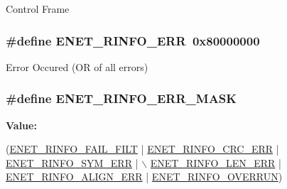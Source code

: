 Control Frame \hypertarget{group__ENET__17XX__40XX_ga15c3af4e6532d6de88860eb58046373a}{
\subsubsection[{E\-N\-E\-T\-\_\-\-R\-I\-N\-F\-O\-\_\-\-E\-R\-R}]{\setlength{\rightskip}{0pt plus 5cm}\#define E\-N\-E\-T\-\_\-\-R\-I\-N\-F\-O\-\_\-\-E\-R\-R~0x80000000}}\label{group__ENET__17XX__40XX_ga15c3af4e6532d6de88860eb58046373a}
Error Occured (O\-R of all errors) \hypertarget{group__ENET__17XX__40XX_ga07c87e5b7136302124084fee594d2d4a}{
\subsubsection[{E\-N\-E\-T\-\_\-\-R\-I\-N\-F\-O\-\_\-\-E\-R\-R\-\_\-\-M\-A\-S\-K}]{\setlength{\rightskip}{0pt plus 5cm}\#define E\-N\-E\-T\-\_\-\-R\-I\-N\-F\-O\-\_\-\-E\-R\-R\-\_\-\-M\-A\-S\-K}}\label{group__ENET__17XX__40XX_ga07c87e5b7136302124084fee594d2d4a}
{\bfseries Value\-:}
\begin{DoxyCode}
(\hyperlink{group__ENET__17XX__40XX_gaf3bb0d91c0511c58691d7189b551fe79}{ENET\_RINFO\_FAIL\_FILT} | \hyperlink{group__ENET__17XX__40XX_gad7ea1586c49309069d1d72a4ebe5aa89}{ENET\_RINFO\_CRC\_ERR}   | 
      \hyperlink{group__ENET__17XX__40XX_ga6c8d6c27397230acdab0d86aae333adb}{ENET\_RINFO\_SYM\_ERR} |  \hyperlink{group__ENET__17XX__40XX_ga9a8b65ee2091950cb6a66c2cf2f8be79}{\(\backslash\)}
\hyperlink{group__ENET__17XX__40XX_ga9a8b65ee2091950cb6a66c2cf2f8be79}{                                 ENET\_RINFO\_LEN\_ERR}   | 
      \hyperlink{group__ENET__17XX__40XX_ga4e4fcb457d4d1a16900c13f7a5a2db46}{ENET\_RINFO\_ALIGN\_ERR} | \hyperlink{group__ENET__17XX__40XX_gac8b350c71c904bca07eab6e4338303cf}{ENET\_RINFO\_OVERRUN})
\end{DoxyCode}
